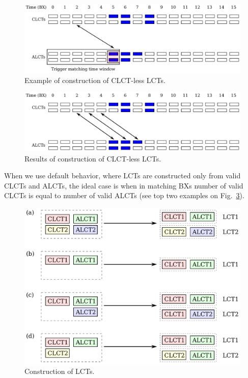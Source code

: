 \begin{figure}[tbh]
        \begin{center}
                \includegraphics[width=0.7\linewidth]{figures/clct_alcts_clctless.pdf}
                \caption{Example of construction of CLCT-less LCTs.}
                \label{fig:clct_alcts_clctless}
        \end{center}
\end{figure}

\begin{figure}[tbh]
        \begin{center}
                \includegraphics[width=0.7\linewidth]{figures/clct_alcts_clctless_end.pdf}
                \caption{Results of construction of CLCT-less LCTs.}
                \label{fig:clct_alcts_clctless_end}
        \end{center}
\end{figure}

When we use default behavior, where LCTs are constructed only from valid CLCTs and ALCTs, the ideal case is when in matching BXs number of valid CLCTs is equal to number of valid ALCTs (see top two examples on Fig.~\ref{fig:clct_alct_corr}).

\begin{figure}[tbh]
        \begin{center}
                \includegraphics[width=0.7\linewidth]{figures/clct_alct_corr.pdf}
                \caption{Construction of LCTs.}
                \label{fig:clct_alct_corr}
        \end{center}
\end{figure}

